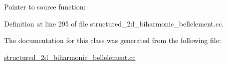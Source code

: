 Pointer to source function\+: 



Definition at line 295 of file structured\+\_\+2d\+\_\+biharmonic\+\_\+bellelement.\+cc.



The documentation for this class was generated from the following file\+:\begin{DoxyCompactItemize}
\item 
\hyperlink{structured__2d__biharmonic__bellelement_8cc}{structured\+\_\+2d\+\_\+biharmonic\+\_\+bellelement.\+cc}\end{DoxyCompactItemize}
